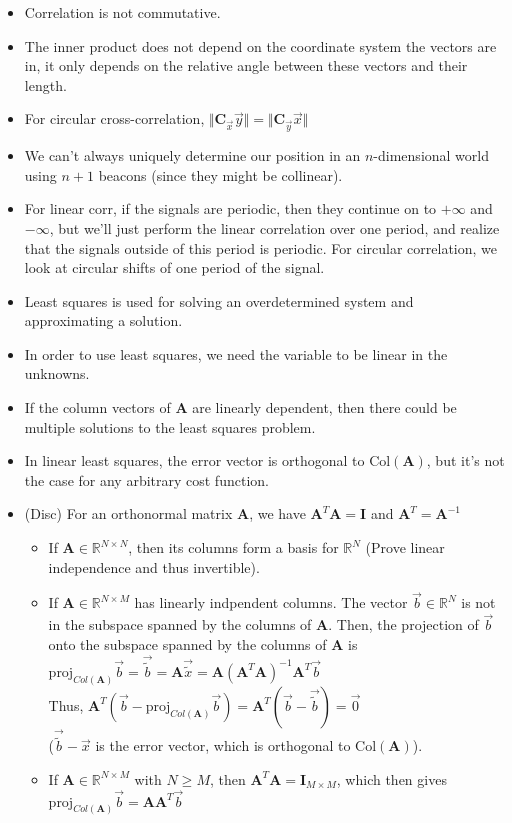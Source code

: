 \documentclass{article}
\begin{document}
\begin{itemize}
	\item Correlation is not commutative.
	\item The inner product does not depend on the coordinate system the vectors are in, it only depends on the relative angle between these vectors and their length.
	\item For circular cross-correlation, $\Vert \mathbf{C}_{\vec{x}} \vec{y} \Vert =
		\Vert \mathbf{C}_{\vec{y}} \vec{x} \Vert$
	\item We can't always uniquely determine our position in an $n$-dimensional world using $n+1$ beacons (since they might be collinear).
	\item For linear corr, if the signals are periodic, then they continue on to $+\infty$ and $-\infty$, but we’ll just perform the linear correlation over one period, and realize that the signals outside of this period is periodic. For circular correlation, we look at circular shifts of one period of the signal.

	\item Least squares is used for solving an {\color{blue} overdetermined} system and approximating a solution.
	\item In order to use least squares, we need the variable to be {\color{red} linear} in the unknowns.
	\item If the column vectors of $\mathbf{A}$ are linearly dependent, then there could be multiple solutions to the least squares problem.
	\item In linear least squares, the error vector is {\color{red} orthogonal} to Col$(\mathbf{A})$, but it's not the case for any arbitrary cost function.

	\item (Disc) For an orthonormal matrix $\mathbf{A}$, we have $\mathbf{A}^T\mathbf{A} = \mathbf{I}$ and $\mathbf{A}^T = \mathbf{A}^{-1}$
	\begin{itemize}
		\item If $\mathbf{A}\in\mathbb{R}^{N\times N}$, then its columns form a basis for $\mathbb{R}^{N}$ (Prove linear independence and thus invertible).
		\item If $\mathbf{A}\in\mathbb{R}^{N\times M}$ has linearly indpendent columns. The vector $\vec{b}\in\mathbb{R}^N$ is not in the subspace spanned by the columns of $\mathbf{A}$. Then, the projection of $\vec{b}$ onto the subspace spanned by the columns of $\mathbf{A}$ is
		$\text{proj}_{Col(\mathbf{A})} \vec{b} =
			\vec{\tilde{b}} = \mathbf{A} \vec{\tilde{x}} =
			\mathbf{A} (\mathbf{A}^T\mathbf{A})^{-1} \mathbf{A}^T \vec{b}$ \\
		Thus, $\mathbf{A}^T (\vec{b} - \text{proj}_{Col(\mathbf{A})} \vec{b}) =
		\mathbf{A}^T (\vec{b} - \vec{\tilde{b}}) = \vec{0}$ \\
		($\vec{\tilde{b}} - \vec{x}$ is the error vector, which is orthogonal to Col$(\mathbf{A})$).
		\item If $\mathbf{A}\in\mathbb{R}^{N\times M}$ with $N\geq M$, then $\mathbf{A}^T\mathbf{A} = \mathbf{I}_{M\times M}$, which then gives
		$\text{proj}_{Col(\mathbf{A})} \vec{b} = \mathbf{A}\mathbf{A}^T \vec{b}$
		

\end{itemize}
\end{itemize}
\end{document}
